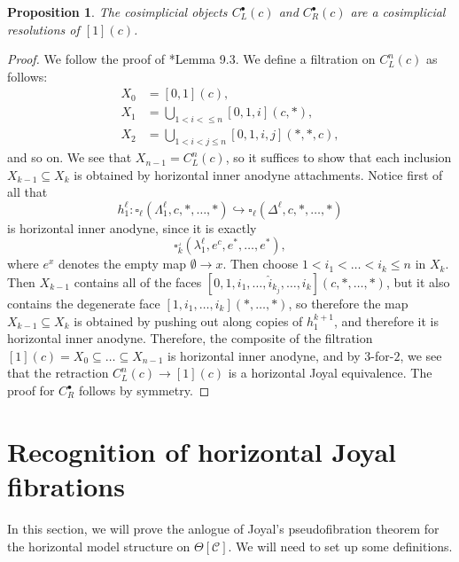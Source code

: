 \documentclass{amsart}
\numberwithin{equation}{section}
\theoremstyle{plain}   %
\newtheorem{prop}[subsection]{Proposition}
\theoremstyle{remark}
\theoremstyle{plain}
\newcommand{\C}{\ensuremath{\mathcal{C}}}
\begin{document}
\begin{prop} 
	The cosimplicial objects \(C^\bullet_L(c)\) and \(C^\bullet_R(c)\) are a cosimplicial resolutions of \([1](c)\).
\end{prop}
\begin{proof}
	We follow the proof of \cite{ds2}*{Lemma 9.3}. We define a filtration on \(C^n_L(c)\) as follows: 
	\begin{align*}
		X_0 &= [0,1](c), \\
		X_1 &= \bigcup_{1< i <\leq n} [0,1,i](c,\ast), \\
		X_2 &= \bigcup_{1< i < j \leq n} [0,1,i,j](\ast,\ast,c),  
	\end{align*}
	and so on.  We see that \(X_{n-1}=C^n_L(c)\), so it suffices to show that each inclusion \(X_{k-1} \subseteq X_{k}\) is obtained by horizontal inner anodyne attachments.  Notice first of all that 
	\[h^\ell_1:\square_\ell(\Lambda^\ell_1,c,\ast,\dots,\ast)\hookrightarrow \square_\ell(\Delta^\ell,c,\ast,\dots,\ast)\] is horizontal inner anodyne, since it is exactly \[\square^\lrcorner_k(\lambda^\ell_1,e^{c},e^\ast,\dots,e^\ast),\] where \(e^x\) denotes the empty map \(\emptyset \to x\).
	Then choose \(1< i_1 < \dots < i_k \leq n\) in \(X_k\).  Then \(X_{k-1}\) contains all of the faces \([0,1,i_1,\dots, \hat{i}_{k_j},\dots,i_k](c,\ast,\dots,\ast)\), but it also contains the degenerate face \([1,i_1,\dots,i_k](\ast,\dots,\ast)\), so therefore the map \(X_{k-1} \subseteq X_k\) is obtained by pushing out along copies of \(h^{k+1}_1\), and therefore it is horizontal inner anodyne.  Therefore, the composite of the filtration \([1](c)=X_0 \subseteq \dots \subseteq X_{n-1}\) is horizontal inner anodyne, and by \(3\)-for-\(2\), we see that the retraction \(C^n_L(c) \to [1](c)\) is a horizontal Joyal equivalence.  The proof for \(C^\bullet_R\) follows by symmetry. 
\end{proof}
\section{Recognition of horizontal Joyal fibrations}\label{admissible}
In this section, we will prove the anlogue of Joyal's pseudofibration theorem for the horizontal model structure on \(\Theta[\C]\).  We will need to set up some definitions.
\end{document}
